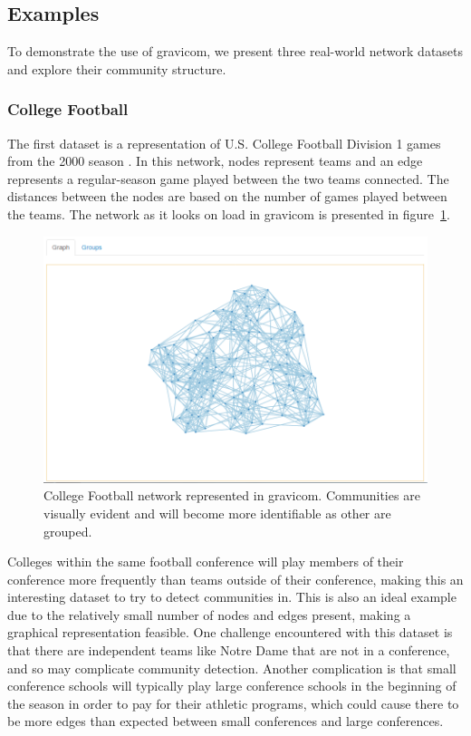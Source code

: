 \documentclass{article}\usepackage[]{graphicx}\usepackage[]{color}
\begin{document}
\subsection{Examples}

To demonstrate the use of gravicom, we present three real-world network datasets and explore their community structure.

\subsubsection{College Football}
The first dataset is a representation of U.S. College Football Division 1 games from the 2000 season \cite{gn-football}. In this network, nodes represent teams and an edge represents a regular-season game played between the two teams connected. The distances between the nodes are based on the number of games played between the teams. The network as it looks on load in gravicom is presented in figure~\ref{fig:football_1}. 

\begin{figure}[H]
\centering
\includegraphics[width=\textwidth]{images/football_1.png}
\caption{\label{fig:football_1} College Football network represented in gravicom. Communities are visually evident and will become more identifiable as other are grouped.}
\end{figure}

Colleges within the same football conference will play members of their conference more frequently than teams outside of their conference, making this an interesting dataset to try to detect communities in. This is also an ideal example due to the relatively small number of nodes and edges present, making a graphical representation feasible. One challenge encountered with this dataset is that there are independent teams like Notre Dame that are not in a conference, and so may complicate community detection. Another complication is that small conference schools will typically play large conference schools in the beginning of the season in order to pay for their athletic programs, which could cause there to be more edges than expected between small conferences and large conferences.
\end{document}
